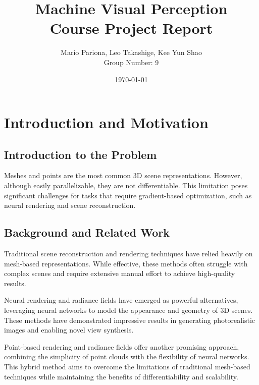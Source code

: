\documentclass[11pt]{report}
\begin{document}
\title{Machine Visual Perception\\Course Project Report}
\author{Mario Pariona, Leo Takashige, Kee Yun Shao\\ Group Number: 9}
\date{\today}
\maketitle

\tableofcontents

\chapter{Introduction and Motivation}
\section{Introduction to the Problem}
Meshes and points are the most common 3D scene representations. However, although easily parallelizable, they are not differentiable. This limitation poses significant challenges for tasks that require gradient-based optimization, such as neural rendering and scene reconstruction.

\section{Background and Related Work}
Traditional scene reconstruction and rendering techniques have relied heavily on mesh-based representations. While effective, these methods often struggle with complex scenes and require extensive manual effort to achieve high-quality results.

Neural rendering and radiance fields have emerged as powerful alternatives, leveraging neural networks to model the appearance and geometry of 3D scenes. These methods have demonstrated impressive results in generating photorealistic images and enabling novel view synthesis.

Point-based rendering and radiance fields offer another promising approach, combining the simplicity of point clouds with the flexibility of neural networks. This hybrid method aims to overcome the limitations of traditional mesh-based techniques while maintaining the benefits of differentiability and scalability.
\end{document}
